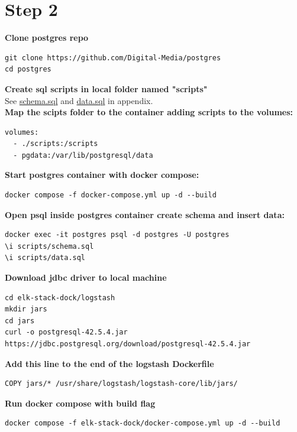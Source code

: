 \documentclass[14pt,a4paper]{extarticle}
\begin{document}
	\newpage

	\section*{Step 2}
	\noindent \textbf{Clone postgres repo}
	\begin{lstlisting}[style=fish]
git clone https://github.com/Digital-Media/postgres
cd postgres
	\end{lstlisting}

	\noindent \textbf{Create sql scripts in local folder named "scripts"} \\
	See \hyperref[listings:schema]{schema.sql} and \hyperref[listings:data]{data.sql} in appendix. \\

	\noindent \textbf{Map the scipts folder to the container adding scripts to the volumes:}
	\begin{lstlisting}[style=fish]
volumes:
  - ./scripts:/scripts
  - pgdata:/var/lib/postgresql/data
	\end{lstlisting}

	\noindent \textbf{Start postgres container with docker compose:}
	\begin{lstlisting}[style=fish]
docker compose -f docker-compose.yml up -d --build
	\end{lstlisting}

	\noindent \textbf{Open psql inside postgres container create schema and insert data:}
	\begin{lstlisting}[style=fish]
docker exec -it postgres psql -d postgres -U postgres
\i scripts/schema.sql
\i scripts/data.sql
	\end{lstlisting}

	\noindent \textbf{Download jdbc driver to local machine}
	\begin{lstlisting}[style=fish]
cd elk-stack-dock/logstash
mkdir jars
cd jars
curl -o postgresql-42.5.4.jar https://jdbc.postgresql.org/download/postgresql-42.5.4.jar
	\end{lstlisting}

	\noindent \textbf{Add this line to the end of the logstash Dockerfile}
	\begin{lstlisting}[style=fish]
COPY jars/* /usr/share/logstash/logstash-core/lib/jars/
	\end{lstlisting}

	\noindent \textbf{Run docker compose with build flag}
	\begin{lstlisting}[style=fish]
docker compose -f elk-stack-dock/docker-compose.yml up -d --build
	\end{lstlisting}
\end{document}
